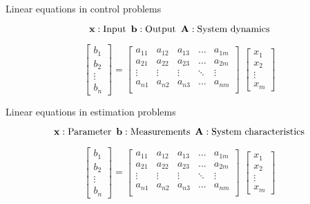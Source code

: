 \documentclass[aspectratio=169]{beamer}
\def\mf{\ensuremath\mathbf}
\begin{document}
\begin{frame}[t]{Linear equations in control problems}
\begin{LARGE}
\[ \mf{x}: \text{Input} \,\,\, \mf{b}: \text{Output} \,\,\, \mf{A}: \text{System dynamics} \]

\[ \begin{bmatrix}
b_1\\ b_2\\ \vdots \\ b_n
\end{bmatrix} = \begin{bmatrix}
a_{11} & a_{12} & a_{13} & \ldots & a_{1m}\\
a_{21} & a_{22} & a_{23} & \ldots & a_{2m}\\
\vdots & \vdots & \vdots & \ddots & \vdots\\
a_{n1} & a_{n2} & a_{n3} & \ldots & a_{nm}\\
\end{bmatrix} \,\, \begin{bmatrix}
x_1\\ x_2\\ \vdots \\ x_m
\end{bmatrix} \]
\end{LARGE}
\end{frame}

\begin{frame}
\end{frame}


\begin{frame}[t]{Linear equations in estimation problems}
\begin{LARGE}
\[ \mf{x}: \text{Parameter} \,\,\, \mf{b}: \text{Measurements} \,\,\, \mf{A}: \text{System characteristics} \]

\[ \begin{bmatrix}
b_1\\ b_2\\ \vdots \\ b_n
\end{bmatrix} = \begin{bmatrix}
a_{11} & a_{12} & a_{13} & \ldots & a_{1m}\\
a_{21} & a_{22} & a_{23} & \ldots & a_{2m}\\
\vdots & \vdots & \vdots & \ddots & \vdots\\
a_{n1} & a_{n2} & a_{n3} & \ldots & a_{nm}\\
\end{bmatrix} \,\, \begin{bmatrix}
x_1\\ x_2\\ \vdots \\ x_m
\end{bmatrix} \]
\end{LARGE}
\end{frame}
\end{document}

